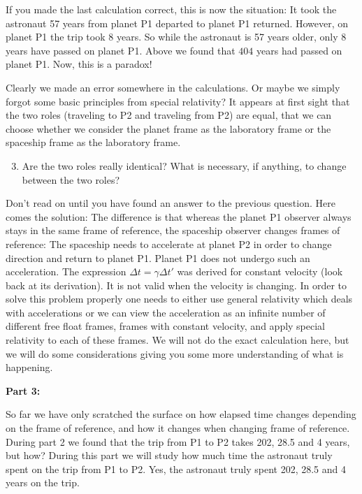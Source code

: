 {\begin{multicols}{2}
If you made the last calculation correct, this is now the situation: It took the astronaut 57 years from planet P1 departed to planet P1 returned. However, on planet P1 the trip took $8$ years. So while the astronaut is 57 years older, only $8$ years have passed on planet P1. Above we found that $404$ years had passed on planet P1. Now, this is a paradox!

Clearly we made an error somewhere in the calculations. Or maybe we simply forgot some basic principles from special relativity? It appears at first sight that the two roles (traveling to P2 and traveling  from P2) are equal, that we can choose whether we consider the planet frame as the laboratory frame or the spaceship frame as the laboratory frame.

\begin{enumerate}
\setcounter{enumi}{2}

\item Are the two roles really identical? What is necessary, if anything, to change between the two roles?
\end{enumerate}

Don't read on until you have found an answer to the previous question. Here comes the solution: The difference is that whereas the planet P1 observer always stays in the same frame of reference, the spaceship observer changes frames of reference: The spaceship needs to accelerate at planet P2 in order to change direction and return to planet P1. Planet P1 does not undergo such an acceleration. The expression $\Delta t=\gamma \Delta t'$ was derived for constant velocity (look back at its derivation). It is not valid when the velocity is changing. In order to solve this problem properly one needs to either use general relativity which deals with accelerations or we can view the acceleration as an infinite number of different free float frames, frames with constant velocity, and apply special relativity to each of these frames. We will not do the exact calculation here, but we will do some considerations giving you some more understanding of what is happening.

{\bf Part 3:}

So far we have only scratched the surface on how elapsed time changes depending on the frame of reference, and how it changes when changing frame of reference. During part 2 we found that the trip from P1 to P2 takes 202, 28.5 and 4 years, but how? During this part we will study how much time the astronaut truly spent on the trip from P1 to P2. Yes, the astronaut truly spent 202, 28.5 and 4 years on the trip.


\end{multicols}}
